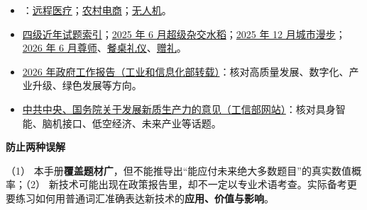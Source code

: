 \documentclass[a4paper,11pt,UTF8,fontset=none]{ctexart}
\begin{document}
\begin{itemize}[leftmargin=1.7em,itemsep=1pt,parsep=0pt,topsep=2pt]
\item {}：\href{\detokenize{https://eol.nju.edu.cn/cet6/papers/202606-1.html}}{远程医疗}；\href{\detokenize{https://eol.nju.edu.cn/cet6/papers/202606-2.html}}{农村电商}；\href{\detokenize{https://eol.nju.edu.cn/cet6/papers/202606-3.html}}{无人机}。\par


\item \noindent \href{\detokenize{https://eol.nju.edu.cn/cet4/}}{四级近年试题索引}；\href{\detokenize{https://eol.nju.edu.cn/cet4/papers/202506-1.html}}{2025 年 6 月超级杂交水稻}；\href{\detokenize{https://eol.nju.edu.cn/cet4/papers/202512-2.html}}{2025 年 12 月城市漫步}；\href{\detokenize{https://eol.nju.edu.cn/cet4/papers/202606-1.html}}{2026 年 6 月尊师}、\href{\detokenize{https://eol.nju.edu.cn/cet4/papers/202606-2.html}}{餐桌礼仪}、\href{\detokenize{https://eol.nju.edu.cn/cet4/papers/202606-3.html}}{赠礼}。\par


\end{itemize}

\par

\begin{itemize}[leftmargin=1.7em,itemsep=1pt,parsep=0pt,topsep=2pt]
\item \noindent \href{\detokenize{https://www.miit.gov.cn/xwfb/szyw/art/2026/art_a0f73af7d13b44b080ae9b71903939af.html}}{2026 年政府工作报告（工业和信息化部转载）}：核对高质量发展、数字化、产业升级、绿色发展等方向。\par


\item \noindent \href{\detokenize{https://www.miit.gov.cn/xwfb/szyw/art/2026/art_bb063b402f814c2d829cb53688ee84c0.html}}{中共中央、国务院关于发展新质生产力的意见（工信部网站）}：核对具身智能、脑机接口、低空经济、未来产业等话题。\par


\end{itemize}

\begin{tcolorbox}[enhanced,breakable,boxrule=0.35pt,colback=VeryPaleRose,colframe=WarmRed!40,left=7pt,right=7pt,top=4pt,bottom=4pt,borderline west={2pt}{0pt}{WarmRed},before skip=4pt,after skip=6pt]
{\bfseries\color{WarmRed} 防止两种误解}\par\vspace{1pt}
\noindent （1） 本手册{\bfseries 覆盖题材广}，但不能推导出“能应付未来绝大多数题目”的真实数值概率；（2） 新技术可能出现在政策报告里，却不一定以专业术语考查。实际备考更要练习如何用普通词汇准确表达新技术的{\bfseries 应用、价值与影响}。\par


\end{tcolorbox}
\end{document}
